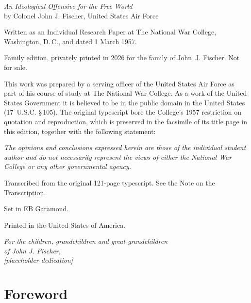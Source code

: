 {\footnotesize\setlength{\parindent}{0pt}\setlength{\parskip}{0.55\onelineskip}
\vspace*{\fill}
\textit{An Ideological Offensive for the Free World}\\
by Colonel John J. Fischer, United States Air Force

Written as an Individual Research Paper at The National War College, Washington, D.\,C., and dated 1 March 1957.

Family edition, privately printed in 2026 for the family of John~J. Fischer. Not for sale.

This work was prepared by a serving officer of the United States Air Force as part of his course of study at The National War College. As a work of the United States Government it is believed to be in the public domain in the United States (17~U.S.C. §\,105). The original typescript bore the College’s 1957 restriction on quotation and reproduction, which is preserved in the facsimile of its title page in this edition, together with the following statement:

\textit{The opinions and conclusions expressed herein are those of the individual student author and do not necessarily represent the views of either the National War College or any other governmental agency.}

Transcribed from the original 121-page typescript. See the Note on the Transcription.

Set in EB Garamond.

Printed in the United States of America.
\par}
\cleartorecto
\vspace*{2.2in}
\begin{center}
{\footnotesize\lsc{[draft]}\par}\vspace{0.8\onelineskip}
\itshape For the children, grandchildren and great-grandchildren\\
of John J. Fischer,\\[0.5ex]
[placeholder dedication]
\end{center}
\cleartorecto
\pagestyle{fischer}
{\setlength{\beforechapskip}{0.25in}%
 \setlength{\cftbeforechapterskip}{0.22\onelineskip}\tableofcontents*}
\cleartorecto
\chapter{Foreword}
\begin{center}\footnotesize{}\end{center}
\vspace{0.5\onelineskip}

